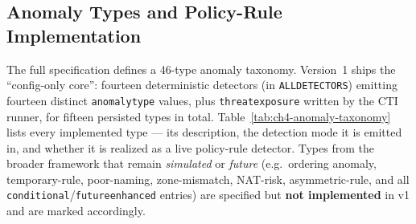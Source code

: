 \documentclass[12pt,a4paper]{report}
\renewcommand{\_}{\textunderscore\allowbreak}
\begin{document}
\subsection{Anomaly Types and Policy-Rule Implementation}
\label{sec:ch4-anomaly-taxonomy}

The full specification defines a 46-type anomaly taxonomy. Version~1 ships the ``config-only core'': fourteen deterministic detectors (in \texttt{ALL\_DETECTORS}) emitting fourteen distinct \texttt{anomaly\_type} values, plus \texttt{threat\_exposure} written by the CTI runner, for fifteen persisted types in total. Table~\ref{tab:ch4-anomaly-taxonomy} lists every implemented type --- its description, the detection mode it is emitted in, and whether it is realized as a live policy-rule detector. Types from the broader framework that remain \emph{simulated} or \emph{future} (e.g.\ ordering anomaly, temporary-rule, poor-naming, zone-mismatch, NAT-risk, asymmetric-rule, and all \texttt{conditional}/\texttt{future\_enhanced} entries) are specified but \textbf{not implemented} in v1 and are marked accordingly.
\end{document}
